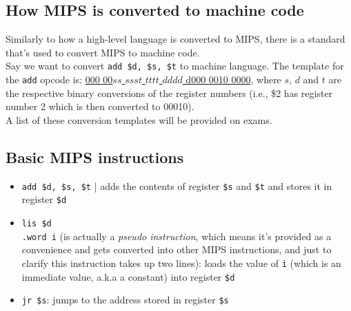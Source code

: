 \documentclass{report}
\begin{document}
\subsection{How MIPS is converted to machine code}
Similarly to how a high-level language is converted to MIPS, there is a standard that's used to convert MIPS to machine code.\\
Say we want to convert \texttt{add \$d, \$s, \$t} to machine language. The template for the \texttt{add} opcode is: \underline{000 00$ss$ $ssst$ $tttt$ $dddd$ d000 0010 0000}, where $s$, $d$ and $t$ are the respective binary conversions of the register numbers (i.e., \$2 has register number 2 which is then converted to 00010).\\
A list of these conversion templates will be provided on exams.
\subsection{Basic MIPS instructions}
\begin{itemize}
\item \texttt{add \$d, \$s, \$t} | adds the contents of register \texttt{\$s} and \texttt{\$t} and stores it in register \texttt{\$d}
\item \texttt{lis \$d\\.word i} (is actually a \textit{pseudo instruction}, which means it's provided as a convenience and gets converted into other MIPS instructions, and just to clarify this instruction takes up two lines): loads the value of \texttt{i} (which is an immediate value, a.k.a a constant) into register \texttt{\$d}
\item \texttt{jr \$s}: jumps to the address stored in register \texttt{\$s}
\end{itemize}
\end{document}

